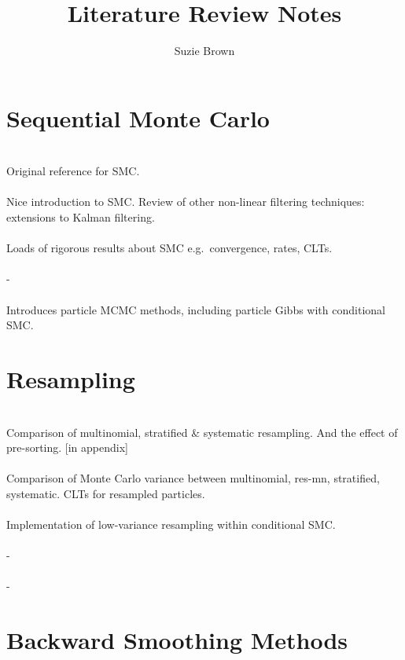 \documentclass{article}
\title{Literature Review Notes}
\author{Suzie Brown}
\begin{document}
\maketitle

\section*{Sequential Monte Carlo}

\textbf{\citet{gordon1993}}\\
Original reference for SMC.
\\[5pt]
\textbf{\citet{kitagawa1996}}\\
Nice introduction to SMC. Review of other non-linear filtering techniques: extensions to Kalman filtering.
\\[5pt]
\textbf{\citet{delmoral2013}}\\
Loads of rigorous results about SMC e.g.\ convergence, rates, CLTs.
\\[5pt]
\textbf{\citet{doucet2009}}\\
-
\\[5pt]
\textbf{\citet{andrieu2010}}\\
Introduces particle MCMC methods, including particle Gibbs with conditional SMC.

\section*{Resampling}

\textbf{\citet{kitagawa1996}}\\
Comparison of multinomial, stratified \& systematic resampling. And the effect of pre-sorting. [in appendix]
\\[5pt]
\textbf{\citet{douc2005}}\\
Comparison of Monte Carlo variance between multinomial, res-mn, stratified, systematic. CLTs for resampled particles.
\\[5pt]
\textbf{\citet{lee2019}}\\
Implementation of low-variance resampling within conditional SMC.
\\[5pt]
\textbf{\citet{murray2016}}\\
-
\\[5pt]
\textbf{\citet{whitley1994}}\\
-

\section*{Backward Smoothing Methods}
\end{document}
